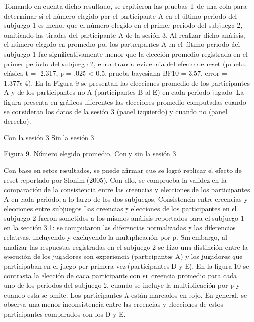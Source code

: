 Tomando en cuenta dicho resultado, se repitieron las pruebas-T de una cola para determinar si el número elegido por el participante A en el último periodo del subjuego 1 es menor que el número elegido en el primer periodo del subjuego 2, omitiendo las tiradas del participante A de la sesión 3. Al realizar dicho análisis, el número elegido en promedio por los participantes A en el último periodo del subjuego 1 fue significativamente menor que la elección promedio registrada en el primer periodo del subjuego 2, encontrando evidencia del efecto de reset (prueba clásica t = -2.317, p = .025 < 0.5, prueba bayesiana BF10 = 3.57, error = 1.377e-4).
 En la Figura 9 se presentan las elecciones promedio de los participantes A y de los participantes no-A (participantes B al E) en cada periodo jugado. La figura presenta en gráficos diferentes las elecciones promedio computadas cuando se consideran los datos de la sesión 3 (panel izquierdo) y cuando no (panel derecho).
  
		Con la sesión 3                                                        Sin la sesión 3

Figura 9. Número elegido promedio. Con y sin la sesión 3.

Con base en estos resultados, se puede afirmar que se logró replicar el efecto de reset reportado por Slonim (2005). Con ello, se comprueba la validez en la comparación de la consistencia entre las creencias y elecciones de los participantes A en cada periodo, a lo largo de los dos subjuegos.
	Consistencia entre creencias y elecciones entre subjuegos
Las creencias y elecciones de los participantes en el subjuego 2 fueron sometidos a los mismos análisis reportados para el subjuego 1 en la sección 3.1: se computaron las diferencias normalizadas y las diferencias relativas, incluyendo y excluyendo la multiplicación por p. Sin embargo, al analizar las respuestas registradas en el subjuego 2 se hizo una distinción entre la ejecución de los jugadores con experiencia (participantes A) y los jugadores que participaban en el juego por primera vez (participantes D y E).
En la figura 10 se contrasta la elección de cada participante con su creencia promedio para cada uno de los periodos del subjuego 2, cuando se incluye la multiplicación por p y cuando esta se omite. Los participantes A están marcados en rojo. En general, se observa una menor inconsistencia entre las creencias y elecciones de estos participantes comparados con los D y E.
   
   
   

